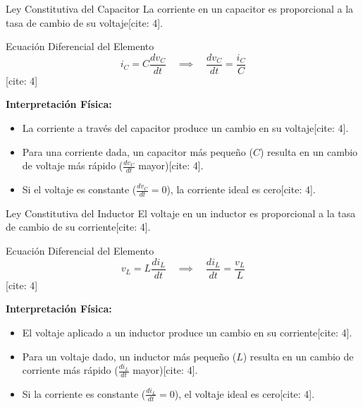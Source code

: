 \documentclass[aspectratio=169, 10pt]{beamer}
\begin{document}
\begin{frame}{Ley Constitutiva del Capacitor}
    La corriente en un capacitor es proporcional a la tasa de cambio de su voltaje[cite: 4].
    
    \begin{block}{Ecuación Diferencial del Elemento}
        $$i_C = C \frac{dv_C}{dt} \quad \implies \quad \frac{dv_C}{dt} = \frac{i_C}{C}$$
[cite: 4]
    \end{block}
    
    \textbf{Interpretación Física:}
    \begin{itemize}
        \item La corriente a través del capacitor produce un cambio en su voltaje[cite: 4].
        \item Para una corriente dada, un capacitor más pequeño ($C$) resulta en un cambio de voltaje más rápido ($\frac{dv_C}{dt}$ mayor)[cite: 4].
        \item Si el voltaje es constante ($\frac{dv_C}{dt}=0$), la corriente ideal es cero[cite: 4].
    \end{itemize}
\end{frame}

\begin{frame}{Ley Constitutiva del Inductor}
    El voltaje en un inductor es proporcional a la tasa de cambio de su corriente[cite: 4].
    
    \begin{block}{Ecuación Diferencial del Elemento}
        $$v_L = L \frac{di_L}{dt} \quad \implies \quad \frac{di_L}{dt} = \frac{v_L}{L}$$
[cite: 4]
    \end{block}
    
    \textbf{Interpretación Física:}
    \begin{itemize}
        \item El voltaje aplicado a un inductor produce un cambio en su corriente[cite: 4].
        \item Para un voltaje dado, un inductor más pequeño ($L$) resulta en un cambio de corriente más rápido ($\frac{di_L}{dt}$ mayor)[cite: 4].
        \item Si la corriente es constante ($\frac{di_L}{dt}=0$), el voltaje ideal es cero[cite: 4].
    \end{itemize}
\end{frame}
\end{document}
